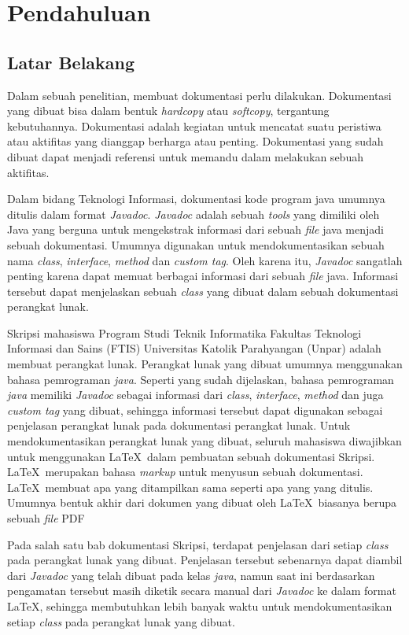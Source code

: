 \chapter{Pendahuluan}
\label{chap:intro}
   
\section{Latar Belakang}
\label{sec:label}

Dalam sebuah penelitian, membuat dokumentasi perlu dilakukan. Dokumentasi yang dibuat bisa dalam bentuk {\it hardcopy} atau {\it softcopy}, tergantung kebutuhannya. Dokumentasi adalah kegiatan untuk mencatat suatu peristiwa atau aktifitas yang dianggap berharga atau penting. Dokumentasi yang sudah dibuat dapat menjadi referensi untuk memandu dalam melakukan sebuah aktifitas.

Dalam bidang Teknologi Informasi, dokumentasi kode program java umumnya ditulis dalam format {\it Javadoc}. {\it Javadoc} adalah sebuah {\it tools} yang dimiliki oleh Java yang berguna untuk mengekstrak informasi dari sebuah {\it file} java menjadi sebuah dokumentasi. Umumnya digunakan untuk mendokumentasikan sebuah nama {\it class}, {\it interface}, {\it method} dan {\it custom tag}. Oleh karena itu, {\it Javadoc} sangatlah penting karena dapat memuat berbagai informasi dari sebuah {\it file} java. Informasi tersebut dapat menjelaskan sebuah {\it class} yang dibuat dalam sebuah dokumentasi perangkat lunak. 

Skripsi mahasiswa Program Studi Teknik Informatika Fakultas Teknologi Informasi dan Sains (FTIS) Universitas Katolik Parahyangan (Unpar) adalah membuat perangkat lunak. Perangkat lunak yang dibuat umumnya menggunakan bahasa pemrograman {\it java}. Seperti yang sudah dijelaskan, bahasa pemrograman {\it java} memiliki {\it Javadoc} sebagai informasi dari {\it class}, {\it interface}, {\it method} dan juga {\it custom tag} yang dibuat, sehingga informasi tersebut dapat digunakan sebagai penjelasan perangkat lunak pada dokumentasi perangkat lunak. Untuk mendokumentasikan perangkat lunak yang dibuat, seluruh mahasiswa diwajibkan untuk menggunakan \LaTeX\ dalam pembuatan sebuah dokumentasi Skripsi. \LaTeX\ merupakan bahasa {\it markup} untuk menyusun sebuah dokumentasi. \LaTeX\ membuat apa yang ditampilkan sama seperti apa yang yang ditulis. Umumnya bentuk akhir dari dokumen yang dibuat oleh \LaTeX\ biasanya berupa sebuah {\it file} PDF

Pada salah satu bab dokumentasi Skripsi, terdapat penjelasan dari setiap {\it class} pada perangkat lunak yang dibuat. Penjelasan tersebut sebenarnya dapat diambil dari {\it Javadoc} yang telah dibuat pada kelas {\it java}, namun saat ini berdasarkan pengamatan tersebut masih diketik secara manual dari {\it Javadoc} ke dalam format \LaTeX, sehingga membutuhkan lebih banyak waktu untuk mendokumentasikan setiap {\it class} pada perangkat lunak yang dibuat.

